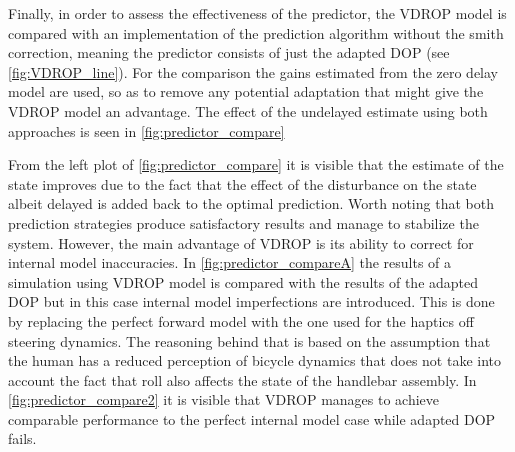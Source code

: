 Finally, in order to assess the effectiveness of the predictor, the VDROP model is compared with an implementation of the prediction algorithm without the smith correction, meaning the predictor consists of just the adapted DOP (see \cref{fig:VDROP_line}). For the comparison the gains estimated from the zero delay model are used, so as to remove any potential adaptation that might give the VDROP model an advantage. The effect of the undelayed estimate using both approaches is seen in \cref{fig:predictor_compare}


From the left plot of \cref{fig:predictor_compare} it is visible that the estimate of the state  improves due to the fact that the effect of the disturbance on the state albeit delayed is added back to the optimal prediction. Worth noting that both prediction strategies produce satisfactory results and manage to stabilize the system. However, the main advantage of  VDROP is its ability to correct for internal model inaccuracies. In \cref{fig:predictor_compareA} the results of a simulation using VDROP  model is compared with the results of the adapted DOP  but in this case internal model imperfections are introduced. This is done by replacing the perfect forward model with  the one used for the haptics off steering dynamics. The reasoning behind that is based on the assumption that the human has a reduced perception of bicycle dynamics that does not take into account the fact that roll also affects the state of the handlebar assembly.  In \cref{fig:predictor_compare2} it is visible that VDROP manages to achieve comparable performance to the perfect internal model case while adapted DOP fails. 


